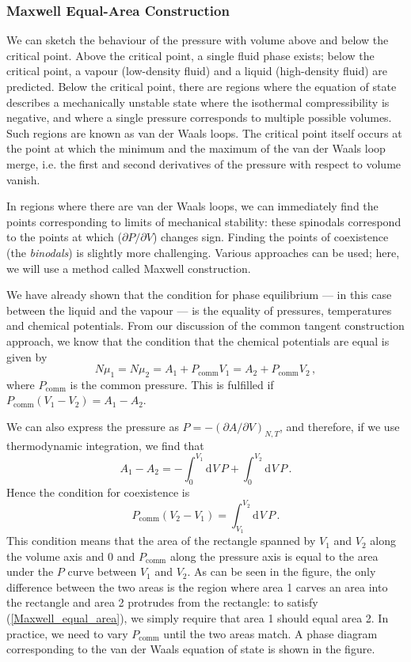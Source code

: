 \documentclass{article}
\theoremstyle{plain}\theoremheaderfont{\normalfont\bfseries}\theorembodyfont{\rmfamily}\theoremseparator{.}\newtheorem*{thm}{Theorem}\newtheorem*{law}{Law}\newtheorem*{pos}{Postulate}
\numberwithin{equation}{section}
\newcommand{\dd}[2][]{\mathrm{d}^{#1} #2\,}
\begin{document}
    \subsubsection{Maxwell Equal-Area Construction}
    We can sketch the behaviour of the pressure with volume above and below the critical point. Above the critical point, a single fluid phase exists; below the critical point, a vapour (low-density fluid) and a liquid (high-density fluid) are predicted. Below the critical point, there are regions where the equation of state describes a mechanically unstable state where the isothermal compressibility is negative, and where a single pressure corresponds to multiple possible volumes. Such regions are known as van der Waals loops. The critical point itself occurs at the point at which the minimum and the maximum of the van der Waals loop merge, i.e. the first and second derivatives of the pressure with respect to volume vanish.

    In regions where there are van der Waals loops, we can immediately find the points corresponding to limits of mechanical stability: these spinodals correspond to the points at which (\(\partial P/\partial V\)) changes sign. Finding the points of coexistence (the \textit{binodals}) is slightly more challenging. Various approaches can be used; here, we will use a method called Maxwell construction.

    We have already shown that the condition for phase equilibrium --- in this case between the liquid and the vapour --- is the equality of pressures, temperatures and chemical potentials. From our discussion of the common tangent construction approach, we know that the condition that the chemical potentials are equal is given by
    \begin{equation}
        N\mu_1=N\mu_2=A_1+P_{\text{comm}}V_1=A_2+P_{\text{comm}}V_2\,,
    \end{equation}
    where \(P_{\text{comm}}\) is the common pressure. This is fulfilled if \(P_{\text{comm}}(V_1-V_2)=A_1-A_2\).

    We can also express the pressure as \(P=-(\partial A/\partial V)_{N,T}\), and therefore, if we use thermodynamic integration, we find that
    \begin{equation}
        A_1-A_2=-\int_0^{V_1}\dd{V}P+\int_{0}^{V_2}\dd{V}P\,.
    \end{equation}
    Hence the condition for coexistence is
    \begin{equation}\label{Maxwell_equal_area}
        P_{\text{comm}}(V_2-V_1)=\int_{V_1}^{V_2}\dd{V}P\,.
    \end{equation}
    This condition means that the area of the rectangle spanned by \(V_1\) and \(V_2\) along the volume axis and 0 and \(P_{\text{comm}}\) along the pressure axis is equal to the area under the \(P\) curve between \(V_1\) and \(V_2\). As can be seen in the figure, the only difference between the two areas is the region where area 1 carves an area
    into the rectangle and area 2 protrudes from the rectangle: to satisfy (\ref{Maxwell_equal_area}), we simply require that area 1 should equal area 2. In practice, we need to vary \(P_{\text{comm}}\) until the two areas match. A phase diagram corresponding to the van der Waals equation of state is shown in the figure.
\end{document}
